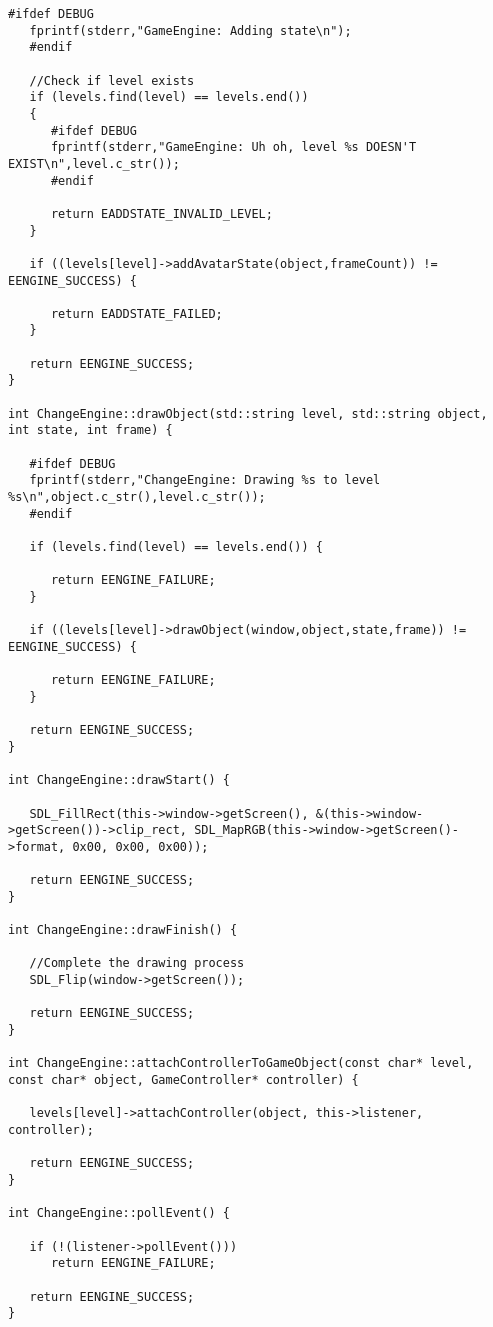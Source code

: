 \documentclass[12pt]{article}
\begin{document}
\begin{lstlisting}[breaklines]
   #ifdef DEBUG
   fprintf(stderr,"GameEngine: Adding state\n");
   #endif
   
   //Check if level exists
   if (levels.find(level) == levels.end())
   {
      #ifdef DEBUG
      fprintf(stderr,"GameEngine: Uh oh, level %s DOESN'T EXIST\n",level.c_str());
      #endif
      
      return EADDSTATE_INVALID_LEVEL;
   }
   
   if ((levels[level]->addAvatarState(object,frameCount)) != EENGINE_SUCCESS) {
      
      return EADDSTATE_FAILED;
   }

   return EENGINE_SUCCESS;
}

int ChangeEngine::drawObject(std::string level, std::string object, int state, int frame) {
   
   #ifdef DEBUG
   fprintf(stderr,"ChangeEngine: Drawing %s to level %s\n",object.c_str(),level.c_str());
   #endif

   if (levels.find(level) == levels.end()) {
      
      return EENGINE_FAILURE;
   }
   
   if ((levels[level]->drawObject(window,object,state,frame)) != EENGINE_SUCCESS) {
      
      return EENGINE_FAILURE;
   }
   
   return EENGINE_SUCCESS;
}

int ChangeEngine::drawStart() {
   
   SDL_FillRect(this->window->getScreen(), &(this->window->getScreen())->clip_rect, SDL_MapRGB(this->window->getScreen()->format, 0x00, 0x00, 0x00));
   
   return EENGINE_SUCCESS;
}

int ChangeEngine::drawFinish() {
   
   //Complete the drawing process
   SDL_Flip(window->getScreen());
   
   return EENGINE_SUCCESS;
}

int ChangeEngine::attachControllerToGameObject(const char* level, const char* object, GameController* controller) {

   levels[level]->attachController(object, this->listener, controller);

   return EENGINE_SUCCESS;
}

int ChangeEngine::pollEvent() {

   if (!(listener->pollEvent()))
      return EENGINE_FAILURE;

   return EENGINE_SUCCESS;
}


\end{lstlisting}
\end{document}
